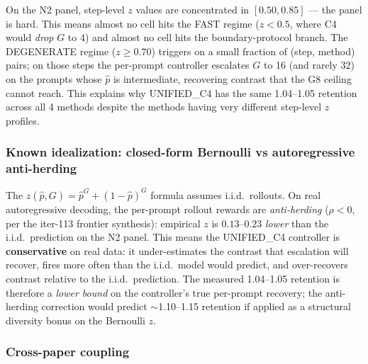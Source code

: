 On the N2 panel, step-level $z$ values are concentrated in $[0.50, 0.85]$
--- the panel is hard. This means almost no cell hits the FAST regime
($z<0.5$, where C4 would \emph{drop} $G$ to 4) and almost no cell hits the
boundary-protocol branch. The DEGENERATE regime ($z \geq 0.70$) triggers
on a small fraction of (step, method) pairs; on those steps the per-prompt
controller escalates $G$ to 16 (and rarely 32) on the prompts whose
$\hat p$ is intermediate, recovering contrast that the G8 ceiling cannot
reach. This explains why UNIFIED\_C4 has the same 1.04--1.05 retention
across all 4 methods despite the methods having very different step-level
$z$ profiles.

\subsubsection*{Known idealization: closed-form Bernoulli vs autoregressive anti-herding}

The $z(\hat p, G) = \hat p^G + (1-\hat p)^G$ formula assumes i.i.d.\ rollouts.
On real autoregressive decoding, the per-prompt rollout rewards are
\emph{anti-herding} ($\rho < 0$, per the iter-113 frontier synthesis):
empirical $z$ is $0.13$--$0.23$ \emph{lower} than the i.i.d.\ prediction
on the N2 panel. This means the UNIFIED\_C4 controller is
\textbf{conservative} on real data: it under-estimates the contrast that
escalation will recover, fires more often than the i.i.d.\ model would
predict, and over-recovers contrast relative to the i.i.d.\ prediction.
The measured 1.04--1.05 retention is therefore a \emph{lower bound} on
the controller's true per-prompt recovery; the anti-herding correction
would predict $\sim$1.10--1.15 retention if applied as a structural
diversity bonus on the Bernoulli $z$.

\subsubsection*{Cross-paper coupling}

